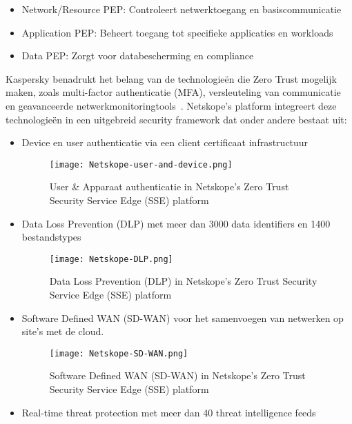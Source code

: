 \begin{itemize}
  \item Network/Resource PEP: Controleert netwerktoegang en basiscommunicatie
  \item Application PEP: Beheert toegang tot specifieke applicaties en workloads
  \item Data PEP: Zorgt voor databescherming en compliance
\end{itemize}

Kaspersky benadrukt het belang van de technologieën die Zero Trust mogelijk maken, zoals multi-factor authenticatie (MFA), versleuteling van communicatie en geavanceerde netwerkmonitoringtools~\autocite{Kaspersky2024}. Netskope's platform integreert deze technologieën in een uitgebreid security framework dat onder andere bestaat uit:

\begin{itemize}
  \item Device en user authenticatie via een client certificaat infrastructuur
  \begin{figure}
    \centering
    \texttt{[image: Netskope-user-and-device.png]}
    \caption[]{User \& Apparaat authenticatie in Netskope's Zero Trust Security Service Edge (SSE) platform~\autocite{Netskope2020}}
  \end{figure}

  \item Data Loss Prevention (DLP) met meer dan 3000 data identifiers en 1400 bestandstypes
  \begin{figure}
    \centering
    \texttt{[image: Netskope-DLP.png]}
    \caption[]{Data Loss Prevention (DLP) in Netskope's Zero Trust Security Service Edge (SSE) platform~\autocite{Netskope2020}}
  \end{figure}

  \item Software Defined WAN (SD-WAN) voor het samenvoegen van netwerken op site's met de cloud.
  \begin{figure}
    \centering
    \texttt{[image: Netskope-SD-WAN.png]}
    \caption[]{Software Defined WAN (SD-WAN) in Netskope's Zero Trust Security Service Edge (SSE) platform~\autocite{Netskope2020}}
  \end{figure}

  \item Real-time threat protection met meer dan 40 threat intelligence feeds
\end{itemize}

